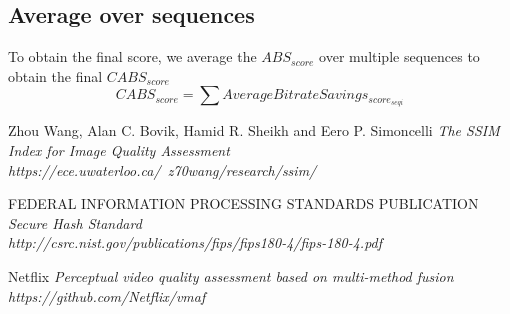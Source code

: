 \documentclass[12pt, conference, hidelinks, onecolumn]{IEEEtran}
\begin{document}
\subsection{Average over sequences}
To obtain the final score, we average the $ABS_{score}$ over multiple sequences to obtain the final $CABS_{score}$
\begin{equation}
CABS_{score} = \sum AverageBitrateSavings_{score_{seqi}}
\end{equation}


\begin{thebibliography}{9}
Zhou Wang,
Alan C. Bovik, 
Hamid R. Sheikh and Eero P. Simoncelli
\emph{The SSIM Index for Image Quality Assessment  \\https://ece.uwaterloo.ca/~z70wang/research/ssim/}

FEDERAL INFORMATION PROCESSING STANDARDS PUBLICATION
\emph{Secure Hash Standard \\http://csrc.nist.gov/publications/fips/fips180-4/fips-180-4.pdf}

Netflix
\emph{Perceptual video quality assessment based on multi-method fusion \\https://github.com/Netflix/vmaf}

\end{thebibliography}
\end{document}
